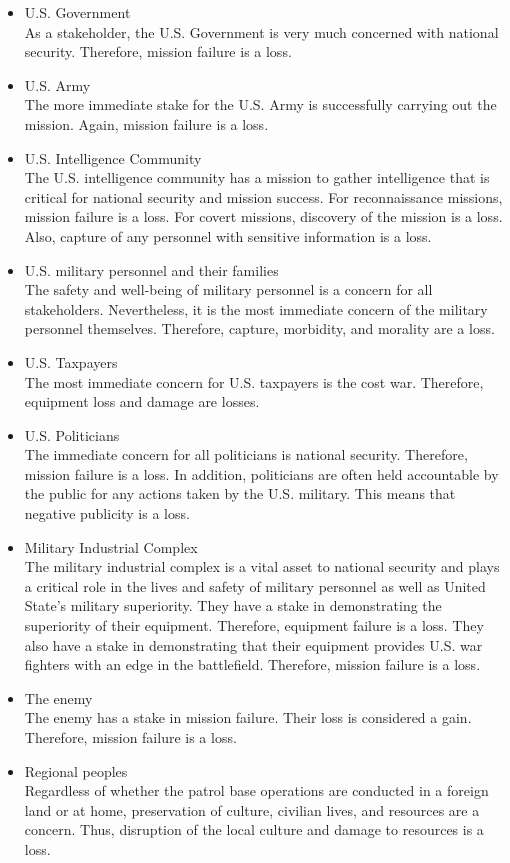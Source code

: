 \documentclass[../../main/main.tex]{subfiles}
\begin{document}
\begin{itemize}
\item U.S. Government\\
As a stakeholder, the U.S. Government is very much concerned with national security. Therefore, mission failure is a loss.
\item U.S. Army\\
The more immediate stake for the U.S. Army is successfully carrying out the mission.  Again, mission failure is a loss.
\item U.S. Intelligence Community\\
The U.S. intelligence community has a mission to gather intelligence that is critical for national security and mission success.  For reconnaissance missions, mission failure is a loss. For covert missions, discovery of the mission is a loss.  Also, capture of any personnel with sensitive information is a loss. 
\item U.S. military personnel and their families\\
The safety and well-being of military personnel is a concern for all stakeholders.  Nevertheless, it is the most immediate concern of the military personnel themselves.  Therefore, capture, morbidity, and morality are a loss.
\item U.S. Taxpayers\\
The most immediate concern for U.S. taxpayers is the cost war.  Therefore, equipment loss and damage are losses.  
\item U.S. Politicians\\
The immediate concern for all politicians is national security.  Therefore, mission failure is a loss.   In addition, politicians are often held accountable by the public for any actions taken by the U.S. military.  This means that negative publicity is a loss.  
\item Military Industrial Complex\\
The military industrial complex is a vital asset to national security and plays a critical role in the lives and safety of military personnel as well as United State's military superiority.  They have a stake in demonstrating the superiority of their equipment.  Therefore, equipment failure is a loss.  They also have a stake in demonstrating that their equipment provides U.S. war fighters with an edge in the battlefield.  Therefore, mission failure is a loss.
\item The enemy\\
The enemy has a stake in mission failure.  Their loss is considered a gain.  Therefore, mission failure is a loss.  
\item Regional peoples\\
Regardless of whether the patrol base operations are conducted in a foreign land or at home, preservation of culture, civilian lives, and resources are a concern.  Thus, disruption of the local culture and damage to resources is a loss. 
\end{itemize}
\end{document}
